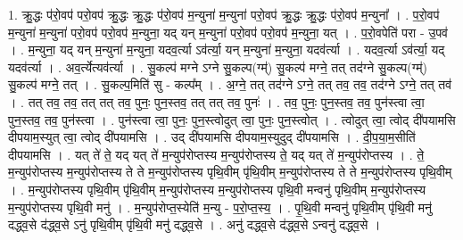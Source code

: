 \documentclass[17pt]{extarticle}
\begin{document}
1. क्रु॒द्धः प॑रो॒वप॑ परो॒वप॑ क्रु॒द्धः क्रु॒द्धः प॑रो॒वप॑ म॒न्युना॑ म॒न्युना॑ परो॒वप॑ क्रु॒द्धः क्रु॒द्धः प॑रो॒वप॑ म॒न्युना᳚ । . प॒रो॒वप॑ म॒न्युना॑ म॒न्युना॑ परो॒वप॑ परो॒वप॑ म॒न्युना॒ यद् यन् म॒न्युना॑ परो॒वप॑ परो॒वप॑ म॒न्युना॒ यत् । . प॒रो॒वपेति॑ परा - उ॒पव॑ । . म॒न्युना॒ यद् यन् म॒न्युना॑ म॒न्युना॒ यदव॒र्त्या ऽव॑र्त्या॒ यन् म॒न्युना॑ म॒न्युना॒ यदव॑र्त्या । . यदव॒र्त्या ऽव॑र्त्या॒ यद् यदव॑र्त्या । . अव॒र्त्येत्यव॑र्त्या । . सु॒कल्प॑ मग्ने ऽग्ने सु॒कल्प(ग्म्॑) सु॒कल्प॑ मग्ने॒ तत् तद॑ग्ने सु॒कल्प(ग्म्॑) सु॒कल्प॑ मग्ने॒ तत् । . सु॒कल्प॒मिति॑ सु - कल्प᳚म् । . अ॒ग्ने॒ तत् तद॑ग्ने ऽग्ने॒ तत् तव॒ तव॒ तद॑ग्ने ऽग्ने॒ तत् तव॑ । . तत् तव॒ तव॒ तत् तत् तव॒ पुनः॒ पुन॒स्तव॒ तत् तत् तव॒ पुनः॑ । . तव॒ पुनः॒ पुन॒स्तव॒ तव॒ पुन॑स्त्वा त्वा॒ पुन॒स्तव॒ तव॒ पुन॑स्त्वा । . पुन॑स्त्वा त्वा॒ पुनः॒ पुन॒स्त्वोदुत् त्वा॒ पुनः॒ पुन॒स्त्वोत् । . त्वोदुत् त्वा॒ त्वोद् दी॑पयामसि दीपयाम॒स्युत् त्वा॒ त्वोद् दी॑पयामसि । . उद् दी॑पयामसि दीपयाम॒स्युदुद् दी॑पयामसि । . दी॒प॒या॒म॒सीति॑ दीपयामसि । . यत् ते॑ ते॒ यद् यत् ते॑ म॒न्युप॑रोप्तस्य म॒न्युप॑रोप्तस्य ते॒ यद् यत् ते॑ म॒न्युप॑रोप्तस्य । . ते॒ म॒न्युप॑रोप्तस्य म॒न्युप॑रोप्तस्य ते ते म॒न्युप॑रोप्तस्य पृथि॒वीम् पृ॑थि॒वीम् म॒न्युप॑रोप्तस्य ते ते म॒न्युप॑रोप्तस्य पृथि॒वीम् । . म॒न्युप॑रोप्तस्य पृथि॒वीम् पृ॑थि॒वीम् म॒न्युप॑रोप्तस्य म॒न्युप॑रोप्तस्य पृथि॒वी मन्वनु॑ पृथि॒वीम् म॒न्युप॑रोप्तस्य म॒न्युप॑रोप्तस्य पृथि॒वी मनु॑ । . म॒न्युप॑रोप्त॒स्येति॑ म॒न्यु - प॒रो॒प्त॒स्य॒ । . पृ॒थि॒वी मन्वनु॑ पृथि॒वीम् पृ॑थि॒वी मनु॑ दद्ध्व॒से द॑द्ध्व॒से ऽनु॑ पृथि॒वीम् पृ॑थि॒वी मनु॑ दद्ध्व॒से । . अनु॑ दद्ध्व॒से द॑द्ध्व॒से ऽन्वनु॑ दद्ध्व॒से । \newline
\end{document}
